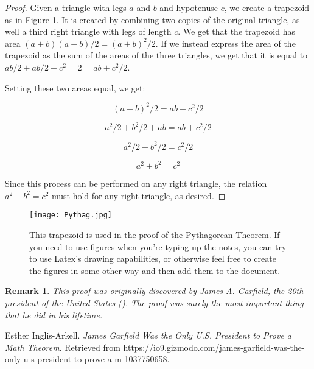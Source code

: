 \documentclass[10pt]{article}         %
\newtheorem{remark}{Remark}[theorem]
\begin{document}
\begin{proof}

Given a triangle with legs $a$ and $b$ and hypotenuse $c$, we create a trapezoid as in Figure \ref{fig:Pythag}.  It is created by combining two copies of the original triangle, as well a third right triangle with legs of length $c$.  We get that the trapezoid has area $(a+b)(a+b)/2=(a+b)^2/2$.  If we instead express the area of the trapezoid as the sum of the areas of the three triangles, we get that it is equal to $ab/2+ab/2+c^2=2=ab+c^2/2$.

Setting these two areas equal, we get:

$$(a+b)^2/2=ab+c^2/2$$

$$a^2/2+b^2/2+ab=ab+c^2/2$$

$$a^2/2+b^2/2=c^2/2$$

$$a^2+b^2=c^2$$

Since this process can be performed on any right triangle, the relation $a^2+b^2=c^2$ must hold for any right triangle, as desired.

\end{proof}

\begin{figure}
  \centerline{\texttt{[image: Pythag.jpg]}}
  \caption{This trapezoid is used in the proof of the Pythagorean Theorem.  If you need to use figures when you're typing up the notes, you can try to use Latex's drawing capabilities, or otherwise feel free to create the figures in some other way and then add them to the document.}
  \label{fig:Pythag}
\end{figure}

\begin{remark}
This proof was originally discovered by James A. Garfield, the 20th president of the United States (\cite{garfield}).  The proof was surely the most important thing that he did in his lifetime.
\end{remark}

\begin{thebibliography}{9}
Esther Inglis-Arkell. 
\textit{James Garfield Was the Only U.S. President to Prove a Math Theorem}. 
Retrieved from https://io9.gizmodo.com/james-garfield-was-the-only-u-s-president-to-prove-a-m-1037750658.

\end{thebibliography}
\end{document}
